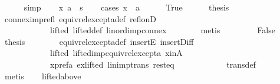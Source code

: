 \begin{isabellebody}
\ \ \ \ \isamarkupfalse%
\ simp\isanewline
\ \ \isamarkupfalse%
\ {\isachardoublequoteopen}{\isacharparenleft}{\kern0pt}x{\isacharcomma}{\kern0pt}\ a{\isacharparenright}{\kern0pt}\ {\isasymin}\ s{\isachardoublequoteclose}\isanewline
\ \ \isamarkupfalse%
\ {\isacharparenleft}{\kern0pt}cases\ {\isachardoublequoteopen}x\ {\isacharequal}{\kern0pt}\ a{\isachardoublequoteclose}{\isacharparenright}{\kern0pt}\isanewline
\ \ \ \ \isamarkupfalse%
\ True\isanewline
\ \ \ \ \isamarkupfalse%
\ {\isacharquery}{\kern0pt}thesis\isanewline
\ \ \ \ \ \ \isamarkupfalse%
\ connex{\isacharunderscore}{\kern0pt}imp{\isacharunderscore}{\kern0pt}refl\ equiv{\isacharunderscore}{\kern0pt}rel{\isacharunderscore}{\kern0pt}except{\isacharunderscore}{\kern0pt}a{\isacharunderscore}{\kern0pt}def\ refl{\isacharunderscore}{\kern0pt}onD\isanewline
\ \ \ \ \ \ \ \ \ \ \ \ lifted\ lifted{\isacharunderscore}{\kern0pt}def\ lin{\isacharunderscore}{\kern0pt}ord{\isacharunderscore}{\kern0pt}imp{\isacharunderscore}{\kern0pt}connex\isanewline
\ \ \ \ \ \ \isamarkupfalse%
\ metis\isanewline
\ \ \isamarkupfalse%
\isanewline
\ \ \ \ \isamarkupfalse%
\ False\isanewline
\ \ \ \ \isamarkupfalse%
\ {\isacharquery}{\kern0pt}thesis\isanewline
\ \ \ \ \ \ \isamarkupfalse%
\ equiv{\isacharunderscore}{\kern0pt}rel{\isacharunderscore}{\kern0pt}except{\isacharunderscore}{\kern0pt}a{\isacharunderscore}{\kern0pt}def\ insertE\ insert{\isacharunderscore}{\kern0pt}Diff\isanewline
\ \ \ \ \ \ \ \ \ \ \ \ lifted\ lifted{\isacharunderscore}{\kern0pt}imp{\isacharunderscore}{\kern0pt}equiv{\isacharunderscore}{\kern0pt}rel{\isacharunderscore}{\kern0pt}except{\isacharunderscore}{\kern0pt}a\ x{\isacharunderscore}{\kern0pt}in{\isacharunderscore}{\kern0pt}A\isanewline
\ \ \ \ \ \ \ \ \ \ \ \ x{\isacharunderscore}{\kern0pt}pref{\isacharunderscore}{\kern0pt}a{\isacharunderscore}{\kern0pt}{}\ ex{\isacharunderscore}{\kern0pt}lifted\ lin{\isacharunderscore}{\kern0pt}imp{\isacharunderscore}{\kern0pt}trans\ rest{\isacharunderscore}{\kern0pt}eq\isanewline
\ \ \ \ \ \ \ \ \ \ \ \ trans{\isacharunderscore}{\kern0pt}def\isanewline
\ \ \ \ \ \ \isamarkupfalse%
\ metis\isanewline
\ \ \isamarkupfalse%
\isanewline
{}\isamarkupfalse%
%
\endisatagproof
{\isafoldproof}%
%
\isadelimproof
\isanewline
%
\endisadelimproof
\isanewline
{}\isamarkupfalse%
\ lifted{\isacharunderscore}{\kern0pt}above{\isacharcolon}{\kern0pt}\isanewline

\end{isabellebody}
